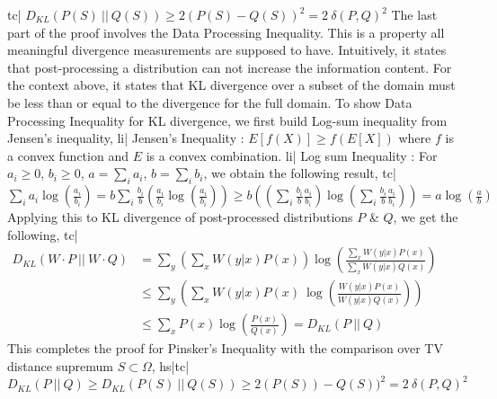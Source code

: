 tc| \( D_{KL}(P(S) \ || \ Q(S)) \ge 2(P(S)-Q(S))^2 = 2 \ \delta(P,Q)^2 \)
The last part of the proof involves the Data Processing Inequality. This is a property all meaningful divergence measurements are supposed to have. Intuitively, it states that post-processing a distribution can not increase the information content. For the context above, it states that KL divergence over a subset of the domain must be less than or equal to the divergence for the full domain.
To show Data Processing Inequality for KL divergence, we first build Log-sum inequality from Jensen's inequality,
li| Jensen's Inequality : \( E[f(X)] \ge f(E[X]) \) where \(f\) is a convex function and \(E\) is a convex combination.
li| Log sum Inequality : For \(a_i \ge 0\), \(b_i \ge 0\), \(a = \sum_i a_i\), \(b = \sum_i b_i\), we obtain the following result,
tc| \( \sum_i a_i \log \left( \frac{a_i}{b_i} \right) = b \sum_i \frac{b_i}{b} \left( \frac{a_i}{b_i} \log \left( \frac{a_i}{b_i} \right) \right) \ge b \left( \left( \sum_i \frac{b_i}{b} \frac{a_i}{b_i} \right) \log \left( \sum_i \frac{b_i}{b} \frac{a_i}{b_i} \right) \right) = a \log \left( \frac{a}{b} \right) \)
Applying this to KL divergence of post-processed distributions \(P\) & \(Q\), we get the following,
tc| \( \begin{align} D_{KL}(W \cdot P \ || \ W \cdot Q) & = \sum_y \left(\sum_x W(y|x) P(x) \right) \log \left( \frac{ \sum_x W(y|x) P(x) }{ \sum_x W(y|x) Q(x) } \right) \\ & \le \sum_y \left( \sum_x W(y|x) P(x) \ \log \left( \frac{ W(y|x) P(x) }{ W(y|x) Q(x) } \right) \right) \\ & \le \sum_x P(x) \log \left( \frac{P(x)}{Q(x)} \right) = D_{KL}(P \ || \ Q) \end{align} \)
This completes the proof for Pinsker's Inequality with the comparison over TV distance supremum \(S \subset \Omega\),
hs|tc| \( D_{KL}(P \ || \ Q) \ge D_{KL}( P(S) \ || \ Q(S)) \ge 2(P(S)) - Q(S))^2 = 2 \ \delta(P, Q)^2 \)
